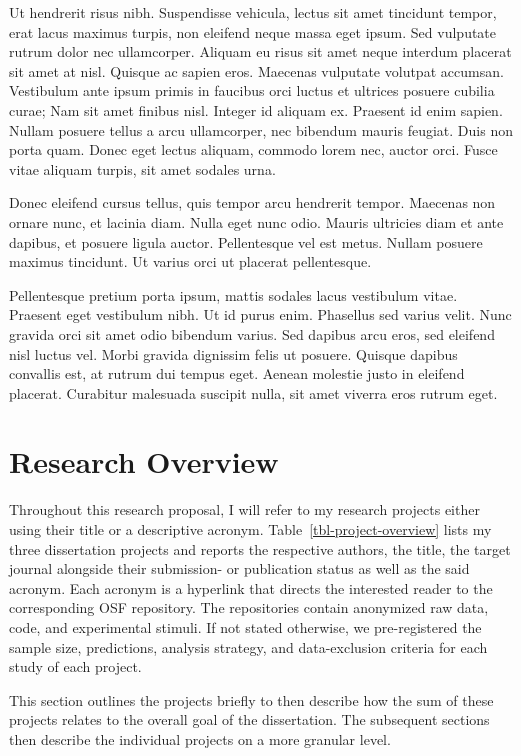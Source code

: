 \documentclass[
  a4paper,
]{scrreprt}
\begin{document}
Ut hendrerit risus nibh. Suspendisse vehicula, lectus sit amet tincidunt
tempor, erat lacus maximus turpis, non eleifend neque massa eget ipsum.
Sed vulputate rutrum dolor nec ullamcorper. Aliquam eu risus sit amet
neque interdum placerat sit amet at nisl. Quisque ac sapien eros.
Maecenas vulputate volutpat accumsan. Vestibulum ante ipsum primis in
faucibus orci luctus et ultrices posuere cubilia curae; Nam sit amet
finibus nisl. Integer id aliquam ex. Praesent id enim sapien. Nullam
posuere tellus a arcu ullamcorper, nec bibendum mauris feugiat. Duis non
porta quam. Donec eget lectus aliquam, commodo lorem nec, auctor orci.
Fusce vitae aliquam turpis, sit amet sodales urna.

Donec eleifend cursus tellus, quis tempor arcu hendrerit tempor.
Maecenas non ornare nunc, et lacinia diam. Nulla eget nunc odio. Mauris
ultricies diam et ante dapibus, et posuere ligula auctor. Pellentesque
vel est metus. Nullam posuere maximus tincidunt. Ut varius orci ut
placerat pellentesque.

Pellentesque pretium porta ipsum, mattis sodales lacus vestibulum vitae.
Praesent eget vestibulum nibh. Ut id purus enim. Phasellus sed varius
velit. Nunc gravida orci sit amet odio bibendum varius. Sed dapibus arcu
eros, sed eleifend nisl luctus vel. Morbi gravida dignissim felis ut
posuere. Quisque dapibus convallis est, at rutrum dui tempus eget.
Aenean molestie justo in eleifend placerat. Curabitur malesuada suscipit
nulla, sit amet viverra eros rutrum eget.

\hypertarget{research-overview}{%
\chapter{Research Overview}\label{research-overview}}

Throughout this research proposal, I will refer to my research projects
either using their title or a descriptive acronym.
Table~\ref{tbl-project-overview} lists my three dissertation projects
and reports the respective authors, the title, the target journal
alongside their submission- or publication status as well as the said
acronym. Each acronym is a hyperlink that directs the interested reader
to the corresponding OSF repository. The repositories contain anonymized
raw data, code, and experimental stimuli. If not stated otherwise, we
pre-registered the sample size, predictions, analysis strategy, and
data-exclusion criteria for each study of each project.

This section outlines the projects briefly to then describe how the sum
of these projects relates to the overall goal of the dissertation. The
subsequent sections then describe the individual projects on a more
granular level.
\end{document}
